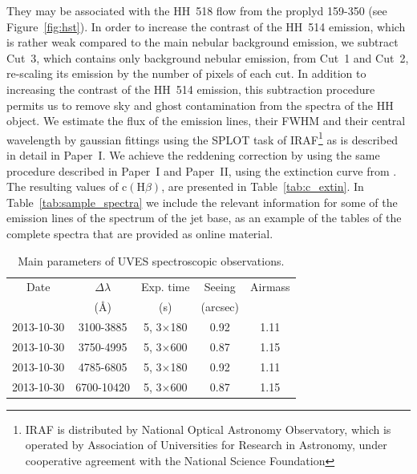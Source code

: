 \documentclass[fleqn,usenatbib]{mnras}
\begin{document}
They may be associated with the HH~518 flow from the proplyd 159-350
(see Figure~\ref{fig:hst}).
In order to increase the contrast of the HH~514 emission, which is rather weak compared to the main nebular background emission, we subtract Cut~3, which contains only background nebular emission, from Cut~1 and Cut~2, re-scaling its emission by the number of pixels of each cut. In addition to increasing the contrast of the HH~514 emission, this subtraction procedure permits us to remove sky and ghost contamination from the spectra of the HH object. We estimate the flux of the emission lines, their FWHM and their central wavelength by gaussian fittings using the SPLOT task of IRAF\footnote{IRAF is distributed by National Optical Astronomy Observatory, which is operated by Association of Universities for Research in Astronomy, under cooperative agreement with the National Science Foundation} \citep{Tody93} as is described in detail in Paper~I. We achieve the reddening correction by using the same procedure described in Paper~I and Paper~II, using the extinction curve from \citet{Blagrave07}. The resulting values of $\text{c}(\text{H}\beta)$, are presented in Table~\ref{tab:c_extin}. In Table~\ref{tab:sample_spectra} we include the relevant information for some of the emission lines of the spectrum of the jet base, as an example of the tables of the complete spectra that are provided as online material.

\begin{table}
\caption{Main parameters of UVES spectroscopic observations.}
\label{tab:obs_set}
\begin{tabular}{ccccc}
\hline
Date & $\Delta \lambda$& Exp. time  &Seeing &Airmass\\
 & (\AA) &  (s) & (arcsec)&\\
\hline
2013-10-30 & 3100-3885 & 5, 3$\times$180 &0.92&1.11\\
2013-10-30 & 3750-4995 & 5, 3$\times$600 & 0.87 & 1.15\\
2013-10-30 & 4785-6805 & 5, 3$\times$180 &0.92&1.11\\
2013-10-30 & 6700-10420 & 5, 3$\times$600 & 0.87 & 1.15\\
\hline
\end{tabular}
\end{table}
\end{document}
